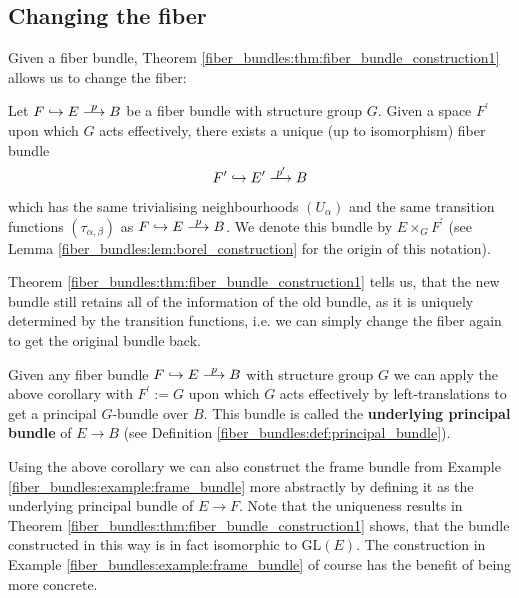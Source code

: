  \subsection{Changing the fiber}

     Given a fiber bundle, Theorem \ref{fiber_bundles:thm:fiber_bundle_construction1} allows us to change the fiber:

    \begin{corollary}
        \label{fiber_bundles:cor:changing_fiber}
        Let $F \hookrightarrow E \oset[0.6pt]{\scalebox{0.8}{$p$}}{\longrightarrow} B$ be a fiber bundle with structure group $G$. Given a space $F^\prime$ upon which $G$ acts effectively, there exists a unique (up to isomorphism) fiber bundle 
        \[
        F^\prime \hookrightarrow E^\prime \oset[3pt]{\scalebox{0.8}{$p^\prime$}}{\longrightarrow} B
        \]
        which has the same trivialising neighbourhoods $(U_\alpha)$ and the same transition functions $(\tau_{\alpha,\beta})$ as $F \hookrightarrow E \oset[0.6pt]{\scalebox{0.8}{$p$}}{\longrightarrow} B$. We denote this bundle by $E \times_G F^\prime$ (see Lemma \ref{fiber_bundles:lem:borel_construction} for the origin of this notation).
    \end{corollary}

    Theorem \ref{fiber_bundles:thm:fiber_bundle_construction1} tells us, that the new bundle still retains all of the information of the old bundle, as it is uniquely determined by the transition functions, i.e. we can simply change the fiber again to get the original bundle back. 

    \begin{example}
         Given any fiber bundle $F \hookrightarrow E \oset[0.6pt]{\scalebox{0.8}{$p$}}{\longrightarrow} B$ with structure group $G$ we can apply the above corollary with $F^\prime := G$ upon which $G$ acts effectively by left-translations to get a principal $G$-bundle over $B$. This bundle is called the \textbf{underlying principal bundle} of $E \to B$ (see Definition \ref{fiber_bundles:def:principal_bundle}).
    \end{example}

    \begin{example}
        Using the above corollary we can also construct the frame bundle from Example \ref{fiber_bundles:example:frame_bundle} more abstractly by defining it as the underlying principal bundle of $E \to F$. Note that the uniqueness results in Theorem \ref{fiber_bundles:thm:fiber_bundle_construction1} shows, that the bundle constructed in this way is in fact isomorphic to $\mathrm{GL}(E)$. The construction in Example \ref{fiber_bundles:example:frame_bundle} of course has the benefit of being more concrete.
    \end{example}

